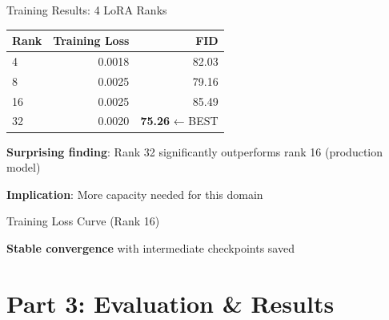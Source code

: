 \documentclass{beamer}
\begin{document}
\begin{frame}{Training Results: 4 LoRA Ranks}
\begin{table}
\centering
\begin{tabular}{lrr}
\toprule
Rank & Training Loss & FID \\
\midrule
4 & 0.0018 & 82.03 \\
8 & 0.0025 & 79.16 \\
16 & 0.0025 & 85.49 \\
32 & 0.0020 & \textbf{75.26} ← BEST \\
\bottomrule
\end{tabular}
\end{table}

\vspace{0.5cm}
\textbf{Surprising finding}: Rank 32 significantly outperforms rank 16 (production model)

\textbf{Implication}: More capacity needed for this domain
\end{frame}

\begin{frame}{Training Loss Curve (Rank 16)}
\begin{center}
\end{center}

\vspace{0.3cm}
\textbf{Stable convergence} with intermediate checkpoints saved
\end{frame}

\section{Part 3: Evaluation \& Results}
\end{document}
